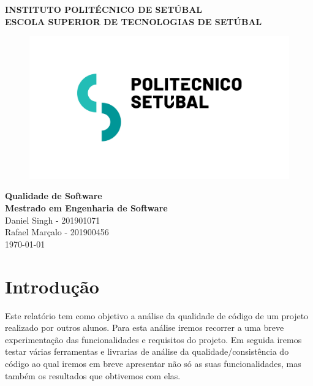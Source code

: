 \documentclass[a4paper,12pt]{article} %
\begin{document}
\begin{titlepage}
	\centering
	\Large \textbf{INSTITUTO POLITÉCNICO DE SETÚBAL} \\
	\normalsize \textbf{ESCOLA SUPERIOR DE TECNOLOGIAS DE SETÚBAL} \\
	\vspace{2cm}
	\begin{figure}[H]
		\centering
		\includegraphics[scale=.5]{images/IPSLogo.png}
	\end{figure}
	\vspace{1cm}
	\Large \textbf{Qualidade de Software}\\
	\Large \textbf{Mestrado em Engenharia de Software}\\
	\vspace{1.5 cm}
	\Large Daniel Singh - 201901071\\
	\Large Rafael Marçalo - 201900456\\
	\vspace{.5cm}
	\large \today
\end{titlepage}

\newpage
\tableofcontents

\newpage
\listoffigures

\newpage
\listoftables

\newpage
\section{Introdução}
Este relatório tem como objetivo a análise da qualidade de código de um projeto realizado por outros alunos. Para esta análise iremos recorrer a uma breve experimentação das funcionalidades e requisitos do projeto. Em seguida iremos testar várias ferramentas e livrarias de análise da qualidade/consistência do código ao qual iremos em breve apresentar não só as suas funcionalidades, mas também os resultados que obtivemos com elas.
\end{document}
